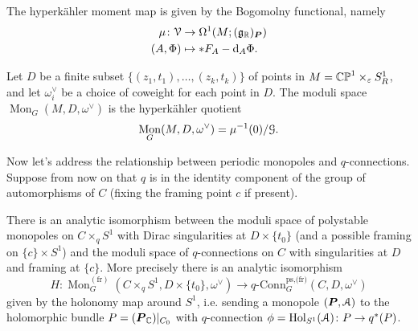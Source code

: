 \documentclass[10pt, oneside]{article}
\DeclareMathOperator{\mon}{Mon}
\newcommand{\qconn}{q\text{-Conn}}
\renewcommand{\d}{\mathrm{d}}
\newcommand{\fr}{\mathrm{fr}}
\DeclareMathOperator{\Hol}{Hol}
\begin{document}
The hyperk\"ahler moment map is given by the Bogomolny functional, namely
\begin{align*}
\mu \colon \mc V &\to \Omega^1(M; (\gg_\RR)_{\bo P}) \\
(A,\Phi) &\mapsto \ast F_A - \d_A \Phi.
\end{align*}

\begin{definition}
Let $D$ be a finite subset $\{(z_1,t_1), \ldots, (z_k, t_k)\}$ of points in $M = \mathbb{CP}^1 \times_\varepsilon S^1_R$, and let $\omega^\vee_{i}$ be a choice of coweight for each point in $D$. The moduli space $\mon_G(M, D, \omega^\vee)$ is the hyperk\"ahler quotient
\[\mon_G(M, D, \omega^\vee) = \mu^{-1}(0) / \mc G.\]
\end{definition}

Now let's address the relationship between periodic monopoles and $q$-connections.  Suppose from now on that $q$ is in the identity component of the group of automorphisms of $C$ (fixing the framing point $c$ if present).

\begin{theorem} \label{monopole_qconn_comparison_thm}
There is an analytic isomorphism between the moduli space of polystable monopoles on $C \times_q S^1$ with Dirac singularities at $D \times \{t_0\}$ (and a possible framing on $\{c\} \times S^1$) and the moduli space of $q$-connections on $C$ with singularities at $D$ and framing at $\{c\}$.  More precisely there is an analytic isomorphism
\[H \colon \mon^{(\fr)}_G(C \times_q S^1, D \times \{t_0\}, \omega^\vee) \to \qconn_G^{\text{ps,(fr)}}(C, D, \omega^\vee)\]
given by the holonomy map around $S^1$, i.e. sending a monopole $(\boldsymbol{P}, \mathcal{A})$ to the holomorphic bundle $P = (\boldsymbol{P}_{\mathbb{C}})|_{C_0}$ with $q$-connection $\phi = \Hol_{S^1}(\mc A) \colon P \to q^*(P)$.
\end{theorem}
\end{document}
